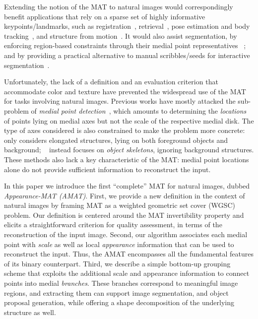 \documentclass[10pt,twocolumn,letterpaper]{article}
\begin{document}
Extending the notion of the MAT to natural images would correspondingly benefit applications that rely on
a sparse set of highly informative keypoints/landmarks, such as registration~\cite{zhou2016estimating}, 
retrieval~\cite{sivic2003video}, pose estimation and body tracking~\cite{shotton2013efficient},
and structure from motion~\cite{agarwal2011building}.
It would also assist segmentation, by enforcing region-based constraints through their medial point representatives
~\cite{teo2015detection}; and by providing a practical alternative to manual 
scribbles/seeds for interactive segmentation~\cite{boykov2001interactive,price2010geodesic,isack2016hedgehog,lin2016scribblesup}.

Unfortunately, the lack of a definition and an evaluation criterion 
that accommodate color and texture have prevented the widespread use of the MAT for tasks involving natural images.
Previous works have mostly attacked the sub-problem of \emph{medial point detection}~\cite{tsogkas2012learning,shen2016object},
which amounts to determining the \emph{locations} of points lying on medial axes 
but not the scale of the respective medial disk.
The type of axes considered is also constrained to make the problem more concrete:
\cite{tsogkas2012learning} only considers elongated structures, lying on both foreground objects and background; 
~\cite{shen2016object} instead focuses on \emph{object skeletons}, ignoring background structures.
These methods also lack a key characteristic of the MAT: medial point locations alone do not provide sufficient
information to reconstruct the input.

In this paper we introduce the first ``complete'' MAT for natural images, dubbed \emph{Appearance-MAT (AMAT)}.
First, we provide a new definition in the context of natural images by framing MAT 
as a weighted geometric set cover (WGSC) problem.
Our definition is centered around the MAT invertibility property and elicits 
a straightforward criterion for quality assessment, in terms of the reconstruction of the input image.
Second, our algorithm associates each medial point with \emph{scale} as well as local \emph{appearance} information
that can be used to reconstruct the input.
Thus, the AMAT encompasses all the fundamental features of its  binary counterpart. 
Third, we describe a simple bottom-up grouping scheme that exploits the additional scale and appearance information to connect
points into medial \emph{branches}.
These branches correspond to meaningful image regions, and extracting them can support image segmentation,
and object proposal generation, while offering a shape decomposition of the underlying structure as well. 
\end{document}
